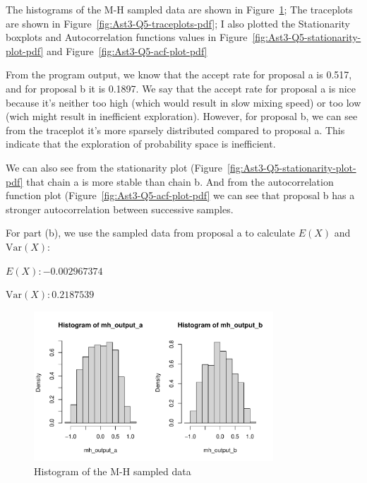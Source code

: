 \documentclass[11pt]{article}
\begin{document}
The histograms of the M-H sampled data are shown in Figure~\ref{fig:Ast3-Q5-hist-pdf};
The traceplots are shown in Figure~\ref{fig:Ast3-Q5-traceplots-pdf};
I also plotted the Stationarity boxplots and Autocorrelation functions values in Figure~\ref{fig:Ast3-Q5-stationarity-plot-pdf} and Figure~\ref{fig:Ast3-Q5-acf-plot-pdf}

From the program output, we know that the accept rate for proposal a is 0.517, and for proposal b it is 0.1897. We say that the accept rate for proposal a is nice because it's neither too high (which would result in slow mixing speed) or too low (wich might result in inefficient exploration). However, for proposal b, we can see from the traceplot it's more sparsely distributed compared to proposal a. This indicate that the exploration of probability space is inefficient.

We can also see from the stationarity plot (Figure~\ref{fig:Ast3-Q5-stationarity-plot-pdf} that chain a is more stable than chain b. And from the autocorrelation function plot (Figure~\ref{fig:Ast3-Q5-acf-plot-pdf} we can see that proposal b has a stronger autocorrelation between successive samples.

For part (b), we use the sampled data from proposal a to calculate $E(X)$ and $\text{Var}(X)$:

$E(X): -0.002967374$

$\text{Var}(X): 0.2187539 $

\begin{figure}[htpb]
	\centering
	\includegraphics[width=0.8\textwidth]{Ast3-Q5-hist.pdf}
	\caption{Histogram of the M-H sampled data}
	\label{fig:Ast3-Q5-hist-pdf}
\end{figure}
\end{document}
